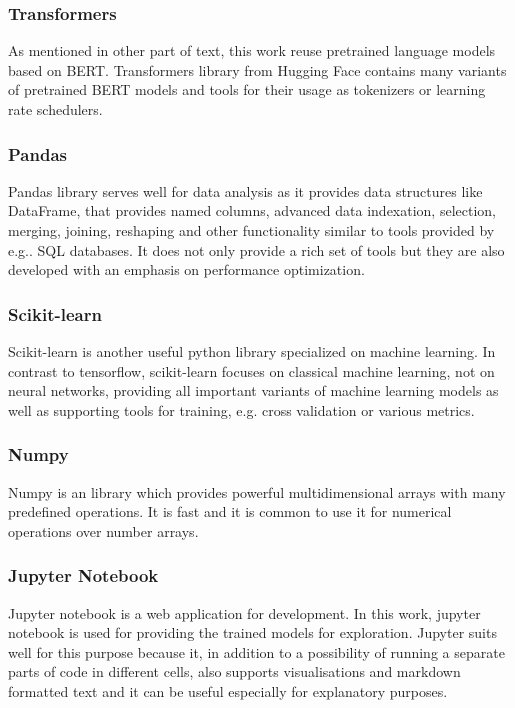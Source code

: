 \subsubsection{Transformers} 
As mentioned in other part of text, this work reuse pretrained language models based on BERT. Transformers library from Hugging Face\citep{Wolf2019HuggingFacesTS} contains many variants of pretrained BERT models and tools for their usage as tokenizers or learning rate schedulers.
\subsubsection{Pandas}
Pandas library \citep{reback2020pandas} serves well for data analysis as it provides data structures like DataFrame, that provides named columns, advanced data indexation, selection, merging, joining, reshaping and other functionality similar to tools provided by e.g.. SQL databases. It does not only provide a rich set of tools but they are also developed with an emphasis on performance optimization.
\subsubsection{Scikit-learn}
Scikit-learn \citep{scikit-learn}  is another useful python library specialized on machine learning. In contrast to tensorflow, scikit-learn focuses on classical machine learning, not on neural networks, providing all important variants of machine learning models as well as supporting tools for training, e.g. cross validation or various metrics.
\subsubsection{Numpy}
Numpy \citep{harris2020array} is an library which provides powerful multidimensional arrays with many predefined operations. It is fast and it is common to use it for numerical operations over number arrays.
\subsubsection{Jupyter Notebook}
Jupyter notebook \citep{jupyter} is a web application for development. In this work, jupyter notebook is used for providing the trained models for exploration. %
Jupyter suits well for this purpose because it, in addition to a possibility of running a separate parts of code in different cells, also supports visualisations and markdown formatted text and it can be useful especially for explanatory purposes.



